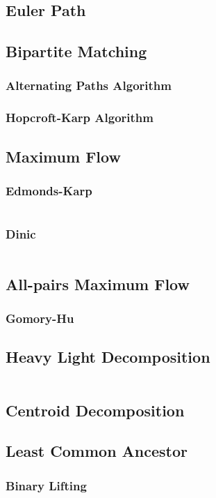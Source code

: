 \documentclass[8pt,a4paper,landscape,oneside]{amsart}
\newcommand{\code}[1]{\inputminted[fontsize=\normalsize,baselinestretch=1]{cpp}{_code/#1}}
\begin{document}
\begin{multicols*}{3}
	\subsection{Euler Path}
	\subsection{Bipartite Matching}
		\subsubsection{Alternating Paths Algorithm}
		\subsubsection{Hopcroft-Karp Algorithm}
	\subsection{Maximum Flow}
		\subsubsection{Edmonds-Karp}
			\code{graphs/edmonds_karp.cpp}
		\subsubsection{Dinic}
			\code{graphs/dinic.cpp}
  \subsection{All-pairs Maximum Flow}
    \subsubsection{Gomory-Hu}
  \subsection{Heavy Light Decomposition}
    \code{graphs/heavy_light_decomposition.cpp}
	\subsection{Centroid Decomposition}
	\subsection{Least Common Ancestor}
		\subsubsection{Binary Lifting}

\end{multicols*}
\end{document}
